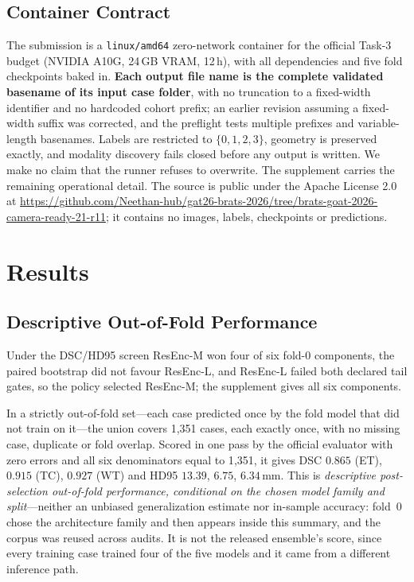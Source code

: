 \documentclass[runningheads]{llncs}
\begin{document}
\subsection{Container Contract}
\label{sec:contract}
The submission is a \texttt{linux/amd64} zero-network container for the official Task-3 budget
(NVIDIA A10G, 24\,GB VRAM, 12\,h), with all dependencies and five fold checkpoints baked in.
\textbf{Each output file name is the complete validated basename of its input case folder}, with no
truncation to a fixed-width identifier and no hardcoded cohort prefix; an earlier revision assuming a
fixed-width suffix was corrected, and the preflight tests multiple prefixes and variable-length
basenames. Labels are restricted to $\{0,1,2,3\}$, geometry is preserved exactly, and modality
discovery fails closed before any output is written. We make no claim that the runner refuses to
overwrite. The supplement carries the remaining operational detail. The source is public under the Apache License 2.0 at
\url{https://github.com/Neethan-hub/gat26-brats-2026/tree/brats-goat-2026-camera-ready-21-r11}; it
contains no images, labels, checkpoints or predictions.

\section{Results}

\subsection{Descriptive Out-of-Fold Performance}
\label{sec:oof}
Under the DSC/HD95 screen ResEnc-M won four of six fold-0 components, the paired bootstrap did not
favour ResEnc-L, and ResEnc-L failed both declared tail gates, so the policy selected ResEnc-M; the
supplement gives all six components.

In a strictly out-of-fold set---each case predicted once by the fold model that did not train on
it---the union covers 1{,}351 cases, each exactly once, with no missing case, duplicate or fold
overlap. Scored in one
pass by the official evaluator with zero errors and all six denominators equal to 1{,}351, it gives
DSC $0.865$ (ET), $0.915$ (TC), $0.927$ (WT) and HD95 $13.39$, $6.75$, $6.34$\,mm. This is
\emph{descriptive post-selection out-of-fold performance, conditional on the chosen model family and
split}---neither an unbiased generalization estimate nor in-sample accuracy: fold~0 chose the
architecture family and then appears inside this summary, and the corpus was reused across audits. It
is not the released ensemble's score, since every training case trained four of the five models and
it came from a different inference path.
\end{document}
